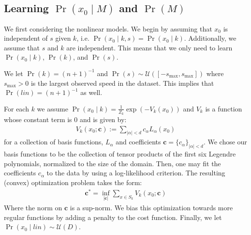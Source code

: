 \documentclass[letterpaper,10pt,conference]{ieeeconf}
\begin{document}
  \subsection{Learning $\Pr( x_0 \mid M)$ and $\Pr(M)$}
  
We first considering the nonlinear models.
  We begin by assuming that $x_0$ is independent of $s$ given $k$, i.e. $\Pr( x_0 \mid k,s) = \Pr(x_0 \mid k)$.
  Additionally, we assume that $s$ and $k$ are independent.
  This means that we only need to learn $\Pr( x_0 \mid k)$, $\Pr(k)$, and $\Pr(s)$.
  
  We let $\Pr(k) = (n+1)^{-1}$ and $\Pr(s) \sim \mathcal{U}( [-s_{\max}, s_{\max} ] )$  where $s_{\max}>0$ is the largest observed speed in the dataset.  
  This implies that $\Pr(lin) = (n+1)^{-1}$ as well.
  
  For each $k$ we assume $\Pr( x_0 \mid k) = \frac{1}{Z_k} \exp( - V_k(x_0) )$ and $V_k$ is a function whose constant term is $0$ and is given by:
  \begin{align*}
  	V_k(x_0; \mathbf{c} ) := \sum_{|\alpha|< d} c_{\alpha} L_{\alpha}( x_0)
  \end{align*}
  for a collection of basis functions, $L_{\alpha}$ and coefficients $\mathbf{c} = \{ c_{\alpha} \}_{|\alpha| < d}$.
  We chose our basis functions to be the collection of tensor products of the first six Legendre polynomials, normalized to the size of the domain.
  Then, one may fit the coefficients $c_{\alpha}$ to the data by using a log-likelihood criterion.
  The resulting (convex) optimization problem takes the form:
  \begin{align*}
  	\mathbf{c}^* = \inf_{ |\mathbf{c}| } \sum_{x \in S_k} V_k( x_0; \mathbf{c})
  \end{align*}
  Where the norm on $\mathbf{c}$ is a sup-norm.
  We bias this optimization towards more regular functions by adding a penalty to the cost function.
    Finally, we let $\Pr( x_0 \mid lin) \sim \mathcal{U}(D)$.
  
\end{document}

